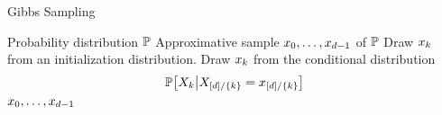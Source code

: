 \begin{algorithm}[hbt!]
    \caption{Gibbs Sampling}\label{alg:Gibbs}
    \begin{algorithmic}
        \Require Probability distribution $\mathbb{P}$
        \Ensure Approximative sample $x_{0},\ldots,x_{d-1}$ of $\mathbb{P}$
        \iosepline
        \ForAll{$\catenumeratorin$}
            \State Draw $x_{k}$ from an initialization distribution. %
        \EndFor
            \ForAll{$\catenumeratorin$}
                \State Draw $x_{k}$ from the conditional distribution
                \begin{align*}
                    \mathbb{P}\big[X_{k}\big|X_{[d]/\{k\}}=x_{[d]/\{k\}}\big]
                \end{align*}
            \EndFor
        \EndWhile
        \State \Return $x_{0},\ldots,x_{d-1}$
    \end{algorithmic}
\end{algorithm}

